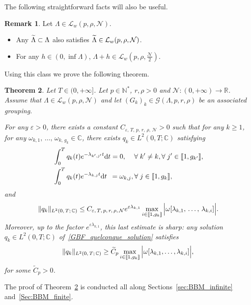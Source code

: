 \documentclass[10pt]{amsart}
\newtheorem{theo}{Theorem}[section]
\theoremstyle{definition}\newtheorem{defi}[theo]{Definition}\newtheorem{rema}[theo]{Remark}\newtheorem{exam}[theo]{Example}\newtheorem{exem}[theo]{Example}\newtheorem{nota}[theo]{Notation}
\newcommand{\llbracket}{\mathopen{[\mkern -2.7mu[}}
\newcommand{\rrbracket}{\mathclose{]\mkern -2.7mu]}}
\newcommand{\inter}[2]{\llbracket #1,#2 \rrbracket}
\newcommand{\n}{g}
\newcommand{\LL}{\mathcal{L}}
\newcommand{\NN}{\mathcal{N}}
\newcommand{\N}{\mathbb{N}}
\newcommand{\R}{\mathbb{R}}
\newcommand{\C}{\mathbb{C}}
\newcommand{\md}{\mathrm{d}}
\let\oldtilde\tilde
\renewcommand*{\tilde}[1]{\mathchoice{\widetilde{#1}}{\widetilde{#1}}{\oldtilde{#1}}{\oldtilde{#1}}}\let\oldexists\exists
\renewcommand*{\exists}{\mathrel{\oldexists}}
\let\oldforall\forall
\renewcommand*{\forall}{\mathrel{\oldforall}}
\begin{document}
The following straightforward facts will also be useful.
\begin{rema}\label{Rem:stabilite_Lw_inclusion}
Let $\Lambda\in \LL_w(p,\rho,\NN)$.
\begin{itemize}
\item Any $\tilde{\Lambda}\subset \Lambda$ also satisfies $\tilde{\Lambda}\in \LL_w(p,\rho,\NN)$.
\item For any $h \in (0,\inf \Lambda)$, $\Lambda+h\in \LL_w \left(p,\rho, \frac{\NN}{2} \right)$.
\end{itemize}
\end{rema}


Using this class we prove the following theorem.
\begin{theo} \label{Th:GBF}
Let $T \in (0,+\infty]$. Let $p \in \N^*$, $r, \rho > 0$ and $\NN : (0,+\infty) \to \R$. Assume that $\Lambda \in \LL_w(p,\rho, \NN)$ and let $(G_k)_k\in \mathcal{G}(\Lambda,p,r,\rho)$ be an associated grouping.

For any $\varepsilon > 0$, there exists a constant $C_{\varepsilon,\,T,\, p,\, r,\, \rho,\, \NN} >0$ such that for any $k \geq 1$, for any $\omega_{k,1},\,\dots,\,\omega_{k,\,\n_k} \in \C$, there exists $q_k \in L^2(0,T ; \C)$ satisfying
\begin{subequations}\label{GBF_quelconque}
\begin{align}
& \int_0^T q_k(t) e^{-\lambda_{k',j'} t } \md t= 0,\quad\,\forall k' \neq k, \forall j' \in \inter{1}{\n_{k'}},\label{GBF_quelconque_ortho}
\\
& \int_0^T q_k(t) e^{-\lambda_{k,j} t } \md t\;\:= \omega_{k,j}, \forall j \in \inter{1}{\n_k},\label{GBF_quelconque_solution}
\end{align}
\end{subequations}
and
\begin{equation}\label{Estimee_GBF}
\| q_k \|_{L^2(0,\,T ;\,\C)} \leq C_{\varepsilon,\,T,\,p,\,r,\,\rho,\,\NN} e^{\varepsilon \lambda_{k,1}} \max \limits_{i\in \inter{1}{\n_k}} \Big| \omega[\lambda_{k,1},\,\dots,\,\lambda_{k,i}] \Big|.
\end{equation}
Moreover, up to the factor $e^{\varepsilon \lambda_{k,1}}$, this last estimate is sharp: any solution $q_k \in L^2(0,T ; \C)$ of~\eqref{GBF_quelconque_solution} satisfies
\begin{equation}\label{Estimee_Inferieure_GBF}
\| q_k \|_{L^2(0,\,T ;\,\C)} \geq \widetilde{C}_{p} \max \limits_{i\in \inter{1}{\n_k}} \Big| \omega[\lambda_{k,1}, \dots, \lambda_{k,i}] \Big|,
\end{equation}
for some $\widetilde{C}_{p} >0$.
\end{theo} The proof of Theorem~\ref{Th:GBF} is conducted all along Sections~\ref{sec:BBM_infinite} and~\ref{Sec:BBM_finite}.
\end{document}
